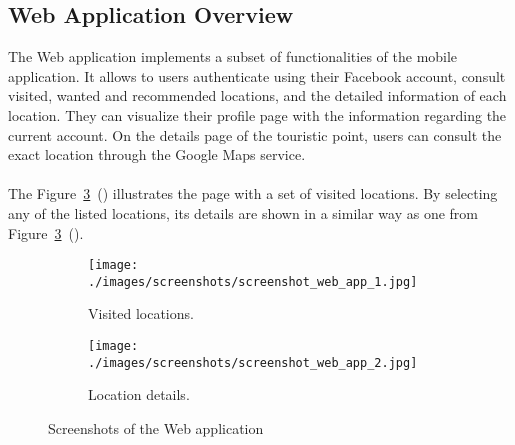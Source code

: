 \subsection{Web Application Overview}
\label{subsec:webAppOveriew}
The Web application implements a subset of functionalities of the mobile application. It allows to users authenticate using their Facebook account, consult visited, wanted and recommended locations, and the detailed information of each location. They can visualize their profile page with the information regarding the current account. On the details page of the touristic point, users can consult the exact location through the Google Maps service.\\
\\
The Figure~\ref{fig:guideMeWebScreenshotsFull}~() illustrates the page with a set of visited locations. By selecting any of the listed locations, its details are shown in a similar way as one from Figure~\ref{fig:guideMeWebScreenshotsFull}~().
\begin{figure}
        \begin{subfigure}[b]{0.5\textwidth}
                \texttt{[image: ./images/screenshots/screenshot\_web\_app\_1.jpg]}
                \caption{Visited locations.}
                \label{fig:guidemeWebScreenshotsFina1}
        \end{subfigure}%
        \begin{subfigure}[b]{0.5\textwidth}
                \texttt{[image: ./images/screenshots/screenshot\_web\_app\_2.jpg]}
                \caption{Location details.}
                \label{fig:guidemeWebScreenshotsFina2}
        \end{subfigure}
        \caption{Screenshots of the Web application}
        \label{fig:guideMeWebScreenshotsFull}
\end{figure}
